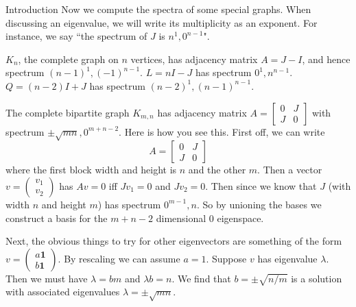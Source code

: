 \documentclass{article}
\begin{document}
\begin{section}{Introduction}
    Now we compute the spectra of some special graphs.
    When discussing an eigenvalue, we will write its multiplicity as an exponent.
    For instance, we say ``the spectrum of $J$ is $n^1, 0^{n-1}$".

    $K_n$, the complete graph on $n$ vertices, has adjacency matrix $A = J - I$, and hence spectrum $(n-1)^1, (-1)^{n-1}$.
    $L = nI - J$ has spectrum $0^1,n^{n-1}$.
    $Q = (n-2)I + J$ has spectrum $(n-2)^1, (n-1)^{n-1}$.

    The complete bipartite graph $K_{m,n}$ has adjacency matrix $A = \begin{bmatrix} 0 & J\\ J & 0\end{bmatrix}$ with spectrum $\pm \sqrt{mn}, 0^{m+n-2}$.
      Here is how you see this.
      First off, we can write
      $$
      A = \begin{bmatrix} 0 & J \\ J & 0\end{bmatrix}
      $$
      where the first block width and height is $n$ and the other $m$.
      Then a vector $v = \begin{pmatrix} v_1 \\ v_2 \end{pmatrix}$ has $Av = 0$ iff
      $Jv_1 = 0$ and $Jv_2 = 0$.
      Then since we know that $J$ (with width $n$ and height $m$) has spectrum $0^{m-1}, n$.
      So by unioning the bases we construct a basis for the $m+n-2$ dimensional 0 eigenspace.

      Next, the obvious things to try for other eigenvectors are something of the form
      $v = \begin{pmatrix} a\mathbf 1 \\ b \mathbf 1 \end{pmatrix}$.
      By rescaling we can assume $a = 1$.
      Suppose $v$ has eigenvalue $\lambda$.
      Then we must have $\lambda = b m$ and $\lambda b = n$.
      We find that $b = \pm\sqrt{n/m}$ is a solution with associated eigenvalues $\lambda = \pm \sqrt{mn}$.


\end{section}
\end{document}
